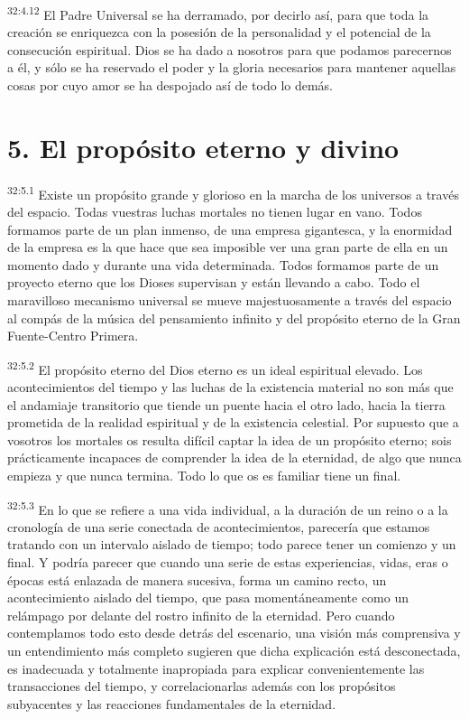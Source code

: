 \par
\textsuperscript{32:4.12} El Padre Universal se ha derramado, por decirlo así, para que toda la creación se enriquezca con la posesión de la personalidad y el potencial de la consecución espiritual. Dios se ha dado a nosotros para que podamos parecernos a él, y sólo se ha reservado el poder y la gloria necesarios para mantener aquellas cosas por cuyo amor se ha despojado así de todo lo demás.

\section*{5. El propósito eterno y divino}
\par
\textsuperscript{32:5.1} Existe un propósito grande y glorioso en la marcha de los universos a través del espacio. Todas vuestras luchas mortales no tienen lugar en vano. Todos formamos parte de un plan inmenso, de una empresa gigantesca, y la enormidad de la empresa es la que hace que sea imposible ver una gran parte de ella en un momento dado y durante una vida determinada. Todos formamos parte de un proyecto eterno que los Dioses supervisan y están llevando a cabo. Todo el maravilloso mecanismo universal se mueve majestuosamente a través del espacio al compás de la música del pensamiento infinito y del propósito eterno de la Gran Fuente-Centro Primera.

\par
\textsuperscript{32:5.2} El propósito eterno del Dios eterno es un ideal espiritual elevado. Los acontecimientos del tiempo y las luchas de la existencia material no son más que el andamiaje transitorio que tiende un puente hacia el otro lado, hacia la tierra prometida de la realidad espiritual y de la existencia celestial. Por supuesto que a vosotros los mortales os resulta difícil captar la idea de un propósito eterno; sois prácticamente incapaces de comprender la idea de la eternidad, de algo que nunca empieza y que nunca termina. Todo lo que os es familiar tiene un final.

\par
\textsuperscript{32:5.3} En lo que se refiere a una vida individual, a la duración de un reino o a la cronología de una serie conectada de acontecimientos, parecería que estamos tratando con un intervalo aislado de tiempo; todo parece tener un comienzo y un final. Y podría parecer que cuando una serie de estas experiencias, vidas, eras o épocas está enlazada de manera sucesiva, forma un camino recto, un acontecimiento aislado del tiempo, que pasa momentáneamente como un relámpago por delante del rostro infinito de la eternidad. Pero cuando contemplamos todo esto desde detrás del escenario, una visión más comprensiva y un entendimiento más completo sugieren que dicha explicación está desconectada, es inadecuada y totalmente inapropiada para explicar convenientemente las transacciones del tiempo, y correlacionarlas además con los propósitos subyacentes y las reacciones fundamentales de la eternidad.

